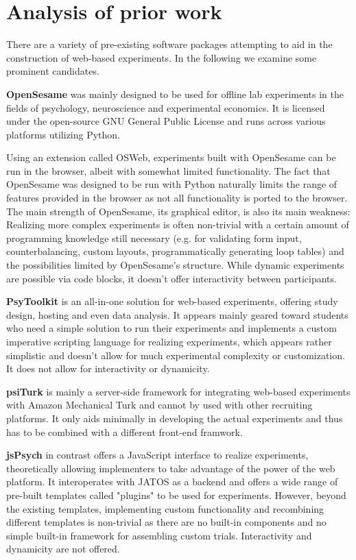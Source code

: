 \documentclass[a4paper,11pt]{scrreprt}
\begin{document}
\chapter{Analysis of prior work}
There are a variety of pre-existing software packages attempting to aid in the construction of web-based experiments. In the following we examine some prominent candidates.

\textbf{OpenSesame} \citep{Mathot2012} was mainly designed to be used for offline lab experiments in the fields of psychology, neuroscience and experimental economics. It is licensed under the open-source GNU General Public License and runs across various platforms utilizing Python.

Using an extension called OSWeb, experiments built with OpenSesame can be run in the browser, albeit with somewhat limited functionality. The fact that OpenSesame was designed to be run with Python naturally limits the range of features provided in the browser as not all functionality is ported to the browser. The main strength of OpenSesame, its graphical editor, is also its main weakness: Realizing more complex experiments is often non-trivial with a certain amount of programming knowledge still necessary (e.g. for validating form input, counterbalancing, custom layouts, programmatically generating loop tables) and the possibilities limited by OpenSesame's structure. While dynamic experiments are possible via code blocks, it doesn't offer interactivity between participants.

\textbf{PsyToolkit} \citep{Stoet2012} is an all-in-one solution for web-based experiments, offering study design, hosting and even data analysis. It appears mainly geared toward students who need a simple solution to run their experiments and implements a custom imperative scripting language for realizing experiments, which appears rather simplistic and doesn't allow for much experimental complexity or customization. It does not allow for interactivity or dynamicity.

\textbf{psiTurk} \citep{Gureckis2016} is mainly a server-side framework for integrating web-based experiments with Amazon Mechanical Turk and cannot by used with other recruiting platforms. It only aids minimally in developing the actual experiments and thus has to be combined with a different front-end framwork.

\textbf{jsPsych} \citep{Leeuw2015} in contrast offers a JavaScript interface to realize experiments, theoretically allowing implementers to take advantage of the power of the web platform. It interoperates with JATOS \citep{Lange2015} as a backend and offers a wide range of pre-built templates called "plugins" to be used for experiments. However, beyond the existing templates, implementing custom functionality and recombining different templates is non-trivial as there are no built-in components and no simple built-in framework for assembling custom trials. Interactivity and dynamicity are not offered.
\end{document}
